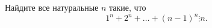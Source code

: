 Найдите все натуральные $n$ такие, что
\begin{equation}
  1^n + 2^n + \ldots + (n - 1)^n \vdots n.
\end{equation}